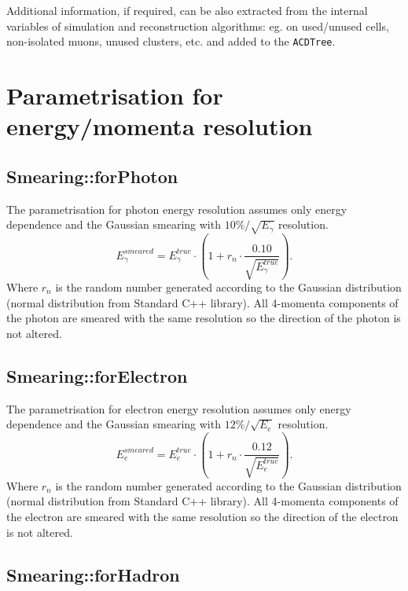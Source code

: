 Additional information, if required, can be also extracted from
the  internal variables of simulation and reconstruction
algorithms: eg. on used/unused cells, non-isolated muons, 
unused clusters, etc. and added to the {\tt ACDTree}.

\section{Parametrisation for energy/momenta resolution}

\subsection{Smearing::forPhoton}

The parametrisation for photon energy resolution assumes only 
energy dependence and the Gaussian
smearing with $10\%/\sqrt{E_{\gamma}}$ resolution.
\begin{equation}
 E_{\gamma}^{smeared}  = 
E_{\gamma}^{true} \cdot (1+ r_n \cdot \frac{0.10}{\sqrt{E_{\gamma}^{true}}}). 
\end{equation}
Where $r_n$ is the random number generated according to the Gaussian
distribution (normal distribution from Standard C++ library).
All 4-momenta components of the photon are smeared with the same
resolution so the direction of the photon is not altered. 

\subsection{Smearing::forElectron}

The parametrisation for electron energy resolution assumes only 
energy dependence and the Gaussian
smearing with $12\%/\sqrt{E_{e}}$ resolution.
\begin{equation}
 E_{e}^{smeared}  = 
E_{e}^{true} \cdot (1+ r_n \cdot \frac{0.12}{\sqrt{E_{e}^{true}}}). 
\end{equation}
Where $r_n$ is the random number generated according to the Gaussian
distribution (normal distribution from Standard C++ library).
All 4-momenta components of the electron are smeared with the same
resolution so the direction of the electron is not altered. 

\subsection{Smearing::forHadron}

